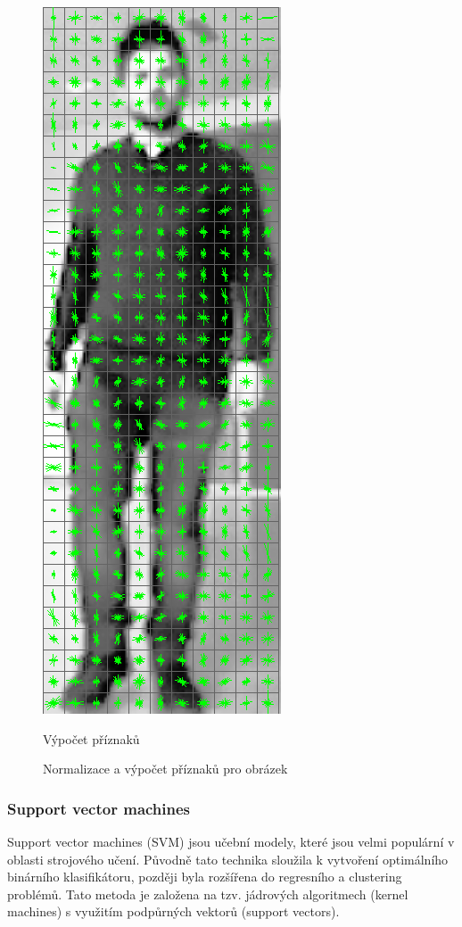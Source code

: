 \begin{figure}[H]
\begin{minipage}{.3\textwidth}
  \includegraphics[width=.5\linewidth]{figures/features}
  \caption*{Výpočet příznaků}
  \label{fig:hog_features}
\end{minipage}
\caption{Normalizace a výpočet příznaků pro obrázek}
\label{fig:hogCalc}
\end{figure}

\subsubsection{Support vector machines}

Support vector machines (SVM) jsou učební modely, které jsou velmi populární v oblasti strojového učení. Původně tato technika sloužila k vytvoření optimálního binárního klasifikátoru, později byla rozšířena do regresního a clustering problémů. Tato metoda je založena na tzv. jádrových algoritmech (kernel machines) s využitím podpůrných vektorů (support vectors).

